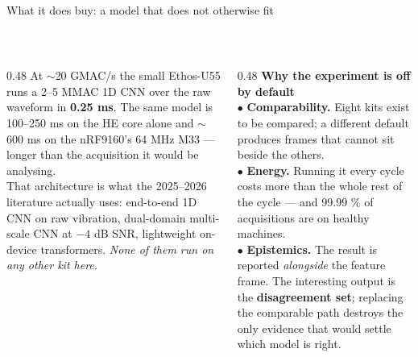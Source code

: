 \documentclass[aspectratio=169,10pt]{beamer}
\begin{document}
\begin{frame}{What it does buy: a model that does not otherwise fit}
  \centering
  \\[3mm]
  \begin{columns}[T]
    \begin{column}{0.48\textwidth}
      \scriptsize
      At $\sim$20 GMAC/s the small Ethos-U55 runs a 2--5 MMAC 1D CNN over the
      raw waveform in \textbf{0.25 ms}. The same model is 100--250 ms on the HE
      core alone and $\sim$600 ms on the nRF9160's 64 MHz M33 --- longer than
      the acquisition it would be analysing.
      \\[1.5mm]
      That architecture is what the 2025--2026 literature actually uses:
      end-to-end 1D CNN on raw vibration, dual-domain multi-scale CNN at
      $-4$ dB SNR, lightweight on-device transformers. \emph{None of them run on
      any other kit here.}
    \end{column}
    \begin{column}{0.48\textwidth}
      \scriptsize
      \textbf{Why the experiment is off by default}
      \\[1mm]
      $\bullet$ \textbf{Comparability.} Eight kits exist to be compared; a
      different default produces frames that cannot sit beside the others.\\[1mm]
      $\bullet$ \textbf{Energy.} Running it every cycle costs more than the
      whole rest of the cycle --- and 99.99 \% of acquisitions are on healthy
      machines.\\[1mm]
      $\bullet$ \textbf{Epistemics.} The result is reported \emph{alongside} the
      feature frame. The interesting output is the \textbf{disagreement set};
      replacing the comparable path destroys the only evidence that would settle
      which model is right.
    \end{column}
  \end{columns}
\end{frame}
\end{document}
